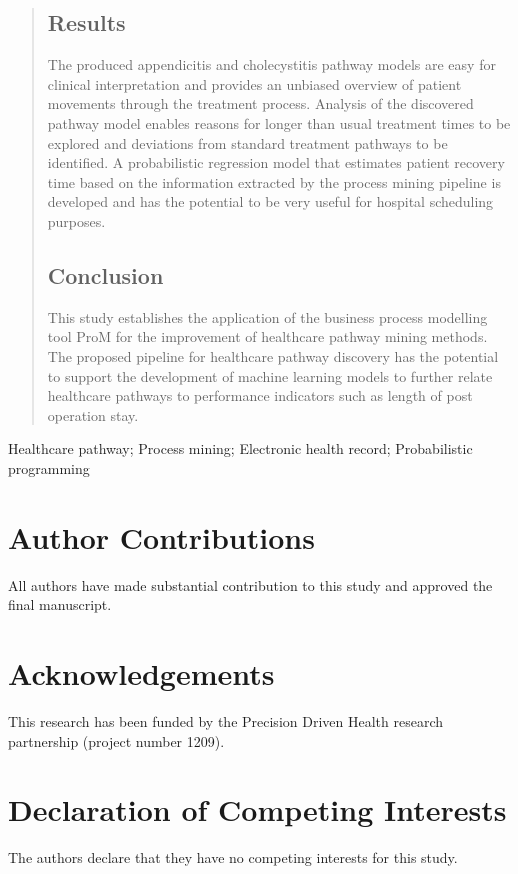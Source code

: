 \documentclass{elsarticle}
\begin{document}
\begin{frontmatter}
\begin{abstract}
\subsection*{Results}
The produced appendicitis and cholecystitis 
pathway models are
easy for clinical interpretation and provides an unbiased overview of patient movements through the treatment process. Analysis of the discovered pathway model enables reasons for longer than usual treatment times to be explored and deviations from standard treatment pathways to be identified. A probabilistic regression model that estimates patient recovery time based on the information extracted by the process mining pipeline is developed and has the potential to be very useful for hospital scheduling purposes.

\subsection*{Conclusion}
This study establishes the application of the business process modelling tool ProM for the improvement of healthcare pathway mining methods. 
The proposed pipeline for healthcare pathway discovery  has the potential to support the development of machine learning models to further relate healthcare pathways to performance indicators such as length of post operation stay. 

\end{abstract}

\begin{keyword}
Healthcare pathway; Process mining; Electronic health record; Probabilistic programming
\end{keyword}

\end{frontmatter}

\linenumbers



\section*{Author Contributions}
All authors have made substantial contribution to this study and approved the final manuscript.

\section*{Acknowledgements}
This research has been funded by the Precision Driven Health research partnership (project number 1209).

\section*{Declaration of Competing Interests}
The authors declare that they have no competing interests for this study.



\begin{appendix}

\end{appendix}
\end{document}
